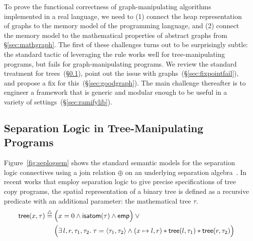 

To prove the functional correctness of graph-manipulating algorithms implemented in a real language, we need to 
(1) connect the heap representation of graphs to the memory model of the 
programming language, and (2) connect the memory model to the mathematical 
properties of abstract graphs from \S\ref{sec:mathgraph}.
The first of these challenges turns out to be surprisingly subtle: 
the standard tactic of leveraging the  rule 
works well for tree-manipulating programs, but fails for graph-manipulating programs.
We review the standard treatment for trees~(\S\ref{sec:seplogtrees}), 
point out the issue with graphs~(\S\ref{sec:fixpointfail}),
and propose a fix for this~(\S\ref{sec:goodgraph}).  
The main challenge thereafter is to engineer a framework that is generic 
and modular enough to be useful in a variety of 
settings~(\S\ref{sec:ramifylib}).



\subsection{Separation Logic in Tree-Manipulating Programs}
\label{sec:seplogtrees}

Figure~\ref{fig:seplogsem} shows the standard semantic models for the separation logic connectives using a join relation $\oplus$ on an underlying separation algebra~\cite{dockins09}. In recent works \citep{o2001local, o2012primer}
that employ separation logic to give
precise specifications of tree copy programs, the spatial
representation of a binary tree is defined as a recursive predicate
with an additional parameter: the mathematical tree $\tau$.
\begin{equation}\label{def:tree}
\begin{split}
    \mathsf{tree}(x, \tau)\;\defeq\;
    &\Big(x=0 \wedge \mathsf{isatom}(\tau) \wedge \mathsf{emp}\Big)
    \vee \null \\ &\Big(\exists\,l,r,\tau_1,\tau_2.\; \tau=\langle \tau_1,
    \tau_2 \rangle \wedge (x \mapsto l,r) \scon
    \mathsf{tree}(l, \tau_1) \scon \mathsf{tree}(r, \tau_2)\Big)
    \end{split}
\end{equation}

